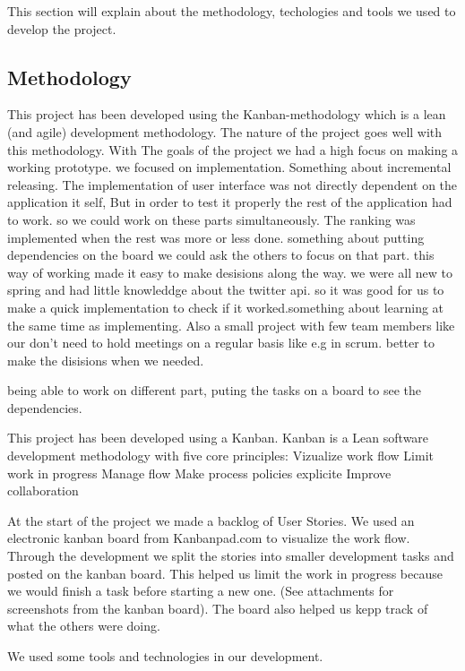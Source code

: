 This section will explain about the methodology, techologies and tools we used to develop the project. 
\subsection{Methodology}

This project has been developed using the Kanban-methodology which is a lean (and agile) development methodology. The nature of the project goes well with this methodology. With The goals of the project we had a high focus on making a working prototype. we focused on implementation. Something about incremental releasing. The implementation of user interface was not directly dependent on the application it self,  But in order to test it properly the rest of the application had to work. so we could work on these parts simultaneously. The ranking was implemented when the rest was more or less done. something about putting dependencies on the board we could ask the others to focus on that part. 
this way of working made it easy to make desisions along the way. we were all new to spring and had little knowleddge about the twitter api. so it was good for us to make a quick implementation to check if it worked.something about learning at the same time as implementing. Also a small project with few team members like our don't need to hold meetings on a regular basis like e.g in scrum. better to make the disisions when we needed.


being able to work on different part, puting the tasks on a board to see the dependencies.

This project has been developed using a Kanban. Kanban is a Lean software development methodology with five core principles:
Vizualize work flow 
Limit work in progress 
Manage flow
Make process policies explicite
Improve collaboration

At the start of the project we made a backlog of User Stories. We used an electronic kanban board from Kanbanpad.com to visualize the work flow. Through the development we split the stories into smaller development tasks and posted on the kanban board. This helped us limit the work in progress because we would finish a task before starting a new one. (See attachments for screenshots from the kanban board). The board also helped us kepp track of what the others were doing.

We used some tools and technologies in our development. 

